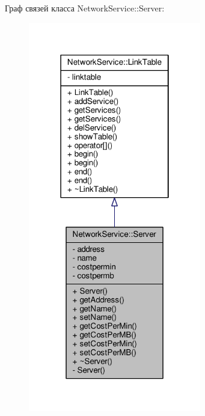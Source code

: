 Граф связей класса Network\+Service\+:\+:Server\+:
\nopagebreak
\begin{figure}[H]
\begin{center}
\leavevmode
\includegraphics[width=214pt]{class_network_service_1_1_server__coll__graph}
\end{center}
\end{figure}
